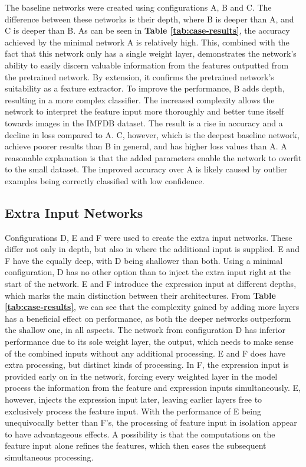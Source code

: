 The baseline networks were created using configurations A, B and C. The difference between these networks is their depth, where B is deeper than A, and C is deeper than B. As can be seen in \textbf{Table \ref{tab:case-results}}, the accuracy achieved by the minimal network A is relatively high. This, combined with the fact that this network only has a single weight layer, demonstrates the network's ability to easily discern valuable information from the features outputted from the pretrained network. By extension, it confirms the pretrained network's suitability as a feature extractor. To improve the performance, B adds depth, resulting in a more complex classifier. The increased complexity allows the network to interpret the feature input more thoroughly and better tune itself towards images in the IMFDB dataset. The result is a rise in accuracy and a decline in loss compared to A. C, however, which is the deepest baseline network, achieve poorer results than B in general, and has higher loss values than A. A reasonable explanation is that the added parameters enable the network to overfit to the small dataset. The improved accuracy over A is likely caused by outlier examples being correctly classified with low confidence.

\subsection{Extra Input Networks}

Configurations D, E and F were used to create the extra input networks. These differ not only in depth, but also in where the additional input is supplied. E and F have the equally deep, with D being shallower than both. Using a minimal configuration, D has no other option than to inject the extra input right at the start of the network. E and F introduce the expression input at different depths, which marks the main distinction between their architectures. From \textbf{Table \ref{tab:case-results}}, we can see that the complexity gained by adding more layers has a beneficial effect on performance, as both the deeper networks outperform the shallow one, in all aspects. The network from configuration D has inferior performance due to its sole weight layer, the output, which needs to make sense of the combined inputs without any additional processing. E and F does have extra processing, but distinct kinds of processing. In F, the expression input is provided early on in the network, forcing every weighted layer in the model process the information from the feature and expression inputs simultaneously. E, however, injects the expression input later, leaving earlier layers free to exclusively process the feature input. With the performance of E being unequivocally better than F's, the processing of feature input in isolation appear to have advantageous effects. A possibility is that the computations on the feature input alone refines the features, which then eases the subsequent simultaneous processing. 

